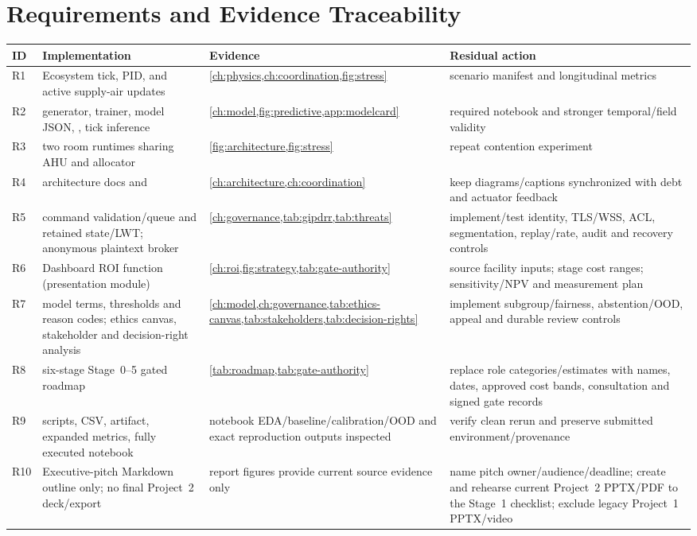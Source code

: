 \chapter{Requirements and Evidence Traceability}
\label{app:trace}
\begin{longtable}{L{0.07\textwidth}L{0.25\textwidth}L{0.34\textwidth}L{0.23\textwidth}}
\toprule
ID & Implementation & Evidence & Residual action\\
\midrule
\endhead
R1 & Ecosystem tick, PID, and active supply-air updates & \cref{ch:physics,ch:coordination,fig:stress} & scenario manifest and longitudinal metrics\\
R2 & generator, trainer, model JSON, , tick inference & \cref{ch:model,fig:predictive,app:modelcard} & required notebook and stronger temporal/field validity\\
R3 & two room runtimes sharing AHU and allocator & \cref{fig:architecture,fig:stress} & repeat contention experiment\\
R4 & architecture docs and  & \cref{ch:architecture,ch:coordination} & keep diagrams/captions synchronized with debt and actuator feedback\\
R5 & command validation/queue and retained state/LWT; anonymous plaintext broker & \cref{ch:governance,tab:gipdrr,tab:threats} & implement/test identity, TLS/WSS, ACL, segmentation, replay/rate, audit and recovery controls\\
R6 & Dashboard ROI function (presentation module) & \cref{ch:roi,fig:strategy,tab:gate-authority} & source facility inputs; stage cost ranges; sensitivity/NPV and measurement plan\\
R7 & model terms, thresholds and reason codes; ethics canvas, stakeholder and decision-right analysis & \cref{ch:model,ch:governance,tab:ethics-canvas,tab:stakeholders,tab:decision-rights} & implement subgroup/fairness, abstention/OOD, appeal and durable review controls\\
R8 & six-stage Stage~0--5 gated roadmap & \cref{tab:roadmap,tab:gate-authority} & replace role categories/estimates with names, dates, approved cost bands, consultation and signed gate records\\
R9 & scripts, CSV, artifact, expanded metrics, fully executed notebook & notebook EDA/baseline/calibration/OOD and exact reproduction outputs inspected & verify clean rerun and preserve submitted environment/provenance\\
R10 & Executive-pitch Markdown outline only; no final Project~2 deck/export & report figures provide current source evidence only & name pitch owner/audience/deadline; create and rehearse current Project~2 PPTX/PDF to the Stage~1 checklist; exclude legacy Project~1 PPTX/video\\
\bottomrule
\end{longtable}

